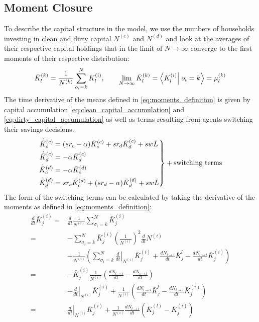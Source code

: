 \subsection{Moment Closure}

To describe the capital structure in the model, we use the numbers of households investing in clean and dirty capital $N^{(c)}$ and $N^{(d)}$ and look at the averages of their respective capital holdings that in the limit of $N \rightarrow \infty$ converge to the first moments of their respective distribution:
\begin{align}
	\bar{K}_l^{(k)} = \frac{1}{N^{(k)}}\sum_{o_i=k}^{N}K_l^{(i)}, \qquad \lim_{N \rightarrow \infty} \bar{K}_{l}^{(k)} = \braket{K_l^{(i)}}{o_i = k} = \mu_l^{(k)}
	\label{eq:moments_definition}
\end{align}
The time derivative of the means defined in \eqref{eq:moments_definition} is given by capital accumulation \eqref{eq:clean_capital_accumulation} and \eqref{eq:dirty_capital_accumulation} as well as terms resulting from agents switching their savings decisions. 
\begin{equation}
\left.  \begin{aligned}
		\dot{\bar{K}}_c^{(c)} &= (sr_c - \alpha)\bar{K}_c^{(c)} + s r_d \bar{K}_d^{(c)} + s w \bar{L} \nonumber \\
		\dot{\bar{K}}_d^{(c)} &= - \alpha\bar{K}_d^{(c)} \nonumber \\
		\dot{\bar{K}}_c^{(d)} &= - \alpha\bar{K}_c^{(d)} \nonumber \\
		\dot{\bar{K}}_d^{(d)} &= sr_c \bar{K}_c^{(d)} + (s r_d - \alpha)\bar{K}_d^{(d)} + s w \bar{L} \nonumber
	\end{aligned} \right\} + \rm{switching\ terms}
\end{equation}
The form of the switching terms can be calculated by taking the derivative of the moments as defined in \eqref{eq:moments_definition}:
\begin{align}
	\frac{d}{dt}\bar{K}_j^{(i)} =& \frac{d}{dt}\frac{1}{N^{(i)}}\sum_{\sigma_i = k}^{N} \bar{K}_j^{(i)} \\
	=& - \sum_{\sigma_i = k}^{N} \bar{K}_j^{(i)} \left(\frac{1}{N^{(i)}}\right)^{2}\frac{d}{dt} N^{(i)} \nonumber \\
	&+ \frac{1}{N^{(i)}} \left( \sum_{\sigma_i = k}^{N} \left. \frac{d}{dt} \right|_{N^{(i)}}\bar{K}_j^{(i)} + \frac{d N_{l \rightarrow i}}{dt} \bar{K}_{j}^{l} - \frac{d N_{i \rightarrow l}}{dt} \bar{K}_{j}^{(i)} \right) \\
	=& - \bar{K}_{j}^{(i)}\frac{1}{N^{(i)}}\left( \frac{d N_{l \rightarrow i}}{dt} - \frac{d N_{i \rightarrow l}}{dt} \right) \nonumber \\
	&+ \left. \frac{d}{dt} \right|_{N^{(i)}}\bar{K}_j^{(i)} +  \frac{1}{N^{(i)}} \left(\frac{d N_{l \rightarrow i}}{dt} \bar{K}_{j}^{l} - \frac{d N_{i \rightarrow l}}{dt} \bar{K}_{j}^{(i)} \right) \\
	=& \left. \frac{d}{dt} \right|_{N^{(i)}}\bar{K}_{j}^{(i)} + \frac{1}{N^{(i)}} \frac{dN_{l \rightarrow i}}{dt} \left(\bar{K}^{(l)}_{j} - \bar{K}^{(i)}_{j}\right) 
	\label{eq:mean_time_derivative}
\end{align}
